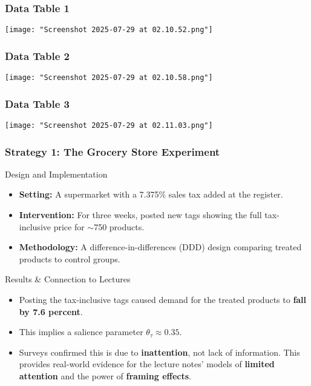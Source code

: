 \documentclass{beamer}
\begin{document}
\begin{frame}
  \frametitle{Data Table 1}
  \begin{center}
    \texttt{[image: "Screenshot 2025-07-29 at 02.10.52.png"]}
  \end{center}
\end{frame}

\begin{frame}
  \frametitle{Data Table 2}
  \begin{center}
    \texttt{[image: "Screenshot 2025-07-29 at 02.10.58.png"]}
  \end{center}
\end{frame}

\begin{frame}
  \frametitle{Data Table 3}
  \begin{center}
    \texttt{[image: "Screenshot 2025-07-29 at 02.11.03.png"]}
  \end{center}
\end{frame}

\begin{frame}
\frametitle{Strategy 1: The Grocery Store Experiment}

\begin{block}{Design and Implementation}
\begin{itemize}
    \item \textbf{Setting:} A supermarket with a 7.375\% sales tax added at the register.
    \item \textbf{Intervention:} For three weeks, posted new tags showing the full tax-inclusive price for $\sim$750 products.
    \item \textbf{Methodology:} A difference-in-differences (DDD) design comparing treated products to control groups.
\end{itemize}
\end{block}

\begin{alertblock}{Results \& Connection to Lectures}
\begin{itemize}
    \item Posting the tax-inclusive tags caused demand for the treated products to \textbf{fall by 7.6 percent}.
    \item This implies a salience parameter $\theta_{\tau} \approx 0.35$.
    \item Surveys confirmed this is due to \textbf{inattention}, not lack of information. This provides real-world evidence for the lecture notes' models of \textbf{limited attention} and the power of \textbf{framing effects}.
\end{itemize}
\end{alertblock}

\end{frame}
\end{document}
